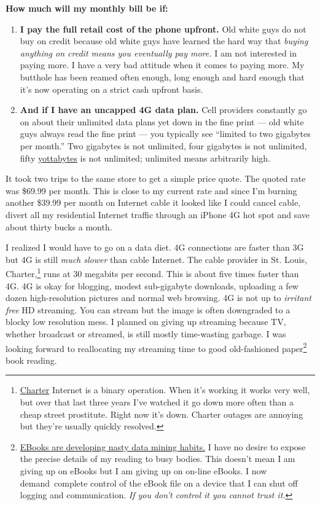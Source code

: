 \textbf{How much will my monthly bill be if:}

\begin{enumerate}
\item
  \textbf{I pay the full retail cost of the phone upfront.} Old white
  guys do not buy on credit because old white guys have learned the hard
  way that \emph{buying anything on credit means you eventually pay
  more.} I am not interested in paying more. I have a very bad attitude
  when it comes to paying more. My butthole has been reamed often
  enough, long enough and hard enough that it's now operating on a
  strict cash upfront basis.
\item
  \textbf{And if I have an uncapped 4G data plan.} Cell providers
  constantly go on about their unlimited data plans yet down in the fine
  print --- old white guys always read the fine print --- you typically
  see ``limited to two gigabytes per month.'' Two gigabytes is not
  unlimited, four gigabytes is not unlimited, fifty
  \href{https://en.wikipedia.org/wiki/Yottabyte}{yottabytes} is not
  unlimited; unlimited means arbitrarily high.
\end{enumerate}

It took two trips to the same store to get a simple price quote. The
quoted rate was \$69.99 per month. This is close to my current rate and
since I'm burning another \$39.99 per month on Internet cable it looked
like I could cancel cable, divert all my residential Internet traffic
through an iPhone 4G hot spot and save about thirty bucks a month.

I realized I would have to go on a data diet. 4G connections are faster
than 3G but 4G is still \emph{much slower} than cable Internet. The
cable provider in St. Louis, Charter,\footnote{
\href{https://www.charter.com/}{Charter} Internet is a binary
operation. When it's working it works very well, but over that last
three years I've watched it go down more often than a cheap street
prostitute. Right now it's down. Charter outages are annoying but
they're usually quickly resolved.
} runs at 30 megabits per second. This is about five times faster than 4G.
4G is okay for blogging, modest sub-gigabyte downloads, uploading a few
dozen high-resolution pictures and normal web browsing. 4G is not up to
\emph{irritant free} HD streaming. You can stream but the image is often
downgraded to a blocky low resolution mess. I planned on giving up
streaming because TV, whether broadcast or streamed, is still mostly
time-wasting garbage. I was looking forward to reallocating my streaming
time to good old-fashioned paper\footnote{
  \href{http://online.wsj.com/news/articles/SB10001424052702304870304577490950051438304}{EBooks
  are developing nasty data mining habits.} I have no desire to expose
  the precise details of my reading to busy bodies. This doesn't mean I
  am giving up on eBooks but I am giving up on on-line eBooks. I now
  demand~complete control of the eBook file on a device that I can shut
  off logging and communication. \emph{If you don't control it you
  cannot trust it.}
} book reading.

